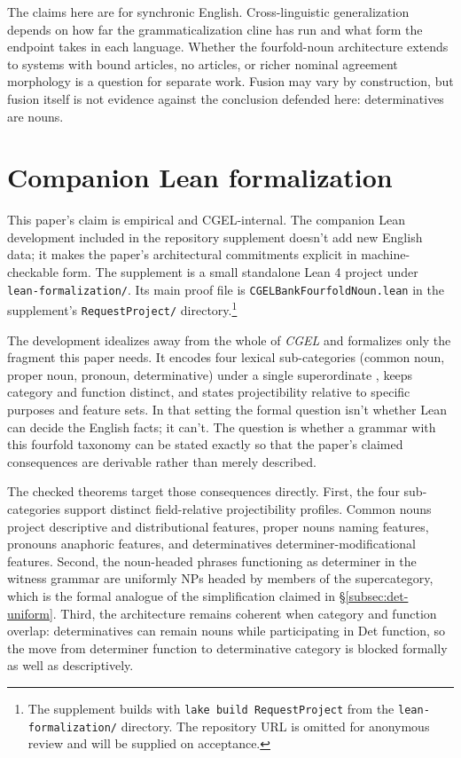 \documentclass[12pt]{article}
\begin{document}
The claims here are for synchronic English. Cross-linguistic generalization depends on how far the grammaticalization cline has run and what form the endpoint takes in each language. Whether the fourfold-noun architecture extends to systems with bound articles, no articles, or richer nominal agreement morphology is a question for separate work. Fusion may vary by construction, but fusion itself is not evidence against the conclusion defended here: determinatives are nouns.

\newpage
\appendix

\section{Companion Lean formalization}\label{sec:lean-appendix}

This paper's claim is empirical and CGEL-internal. The companion Lean development included in the repository supplement doesn't add new English data; it makes the paper's architectural commitments explicit in machine-checkable form. The supplement is a small standalone Lean 4 project under \texttt{lean-formalization/}. Its main proof file is \texttt{CGELBankFourfoldNoun.lean} in the supplement's \texttt{RequestProject/} directory.\footnote{The supplement builds with \texttt{lake build RequestProject} from the \texttt{lean-formalization/} directory. The repository URL is omitted for anonymous review and will be supplied on acceptance.}

The development idealizes away from the whole of \textit{CGEL} and formalizes only the fragment this paper needs. It encodes four lexical sub-categories (common noun, proper noun, pronoun, determinative) under a single superordinate , keeps category and function distinct, and states projectibility relative to specific purposes and feature sets. In that setting the formal question isn't whether Lean can decide the English facts; it can't. The question is whether a grammar with this fourfold taxonomy can be stated exactly so that the paper's claimed consequences are derivable rather than merely described.

The checked theorems target those consequences directly. First, the four sub-categories support distinct field-relative projectibility profiles. Common nouns project descriptive and distributional features, proper nouns naming features, pronouns anaphoric features, and determinatives determiner-modificational features. Second, the noun-headed phrases functioning as determiner in the witness grammar are uniformly NPs headed by members of the  supercategory, which is the formal analogue of the simplification claimed in §\ref{subsec:det-uniform}. Third, the architecture remains coherent when category and function overlap: determinatives can remain nouns while participating in Det function, so the move from determiner function to determinative category is blocked formally as well as descriptively.
\end{document}
